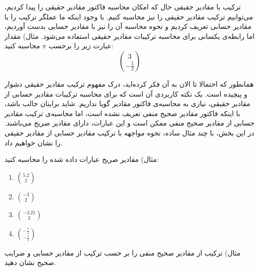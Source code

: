 \begin{EXTRA}{
    ترکیب با مقادیر حقیقی
}
\p
حال که امکان محاسبه فاکتور مقادیر حقیقی را پیدا کردیم، می‌توانیم ترکیب مقادیر
حقیقی را نیز محاسبه کنیم. با وجود اینکه ما عملگر ترکیب
را با مقادیر حسابی تعریف کردیم و نحوه محاسبه آن را نیز با مقادیر حسابی بدست آوردیم،
اما رابطه‌ی یکسانی برای محاسبه ترکیبات مقادیر حقیقی استفاده می‌شود.
\p
مثال)
مقدار عبارت زیر را برحسب $\pi$ محاسبه کنید:
$$3 \choose -\frac{5}{2}$$

\p
همانطور که احتمالا تا الان به آن فکر کرده‌اید، درک مفهوم ترکیب مقادیر حقیقی دشوار و پیچیده است.
\p
یک نکته کاربردی آن است که برای محاسبه ترکیبات مقادیر حسابی از مقادیر حقیقی، نیازی به
محاسبه‌ی فاکتور مقادیر گویا نداریم.
شاید برایتان جالب باشد، با اینکه فاکتور مقادیر صحیح منفی تعریف نشده است، اما محاسبه‌ی
ترکیب مقادیر حسابی از مقادیر صحیح منفی ممکن است و این عبارات، دارای مقادیر صریح می‌باشند.
در این بخش، با چند مثال ساده، نحوه مواجهه با ترکیب مقادیر حسابی از مقادیر حقیقی را نشان خواهیم داد.

\p
مثال)
مقادیر صریح عبارات داده شده را محاسبه کنید:

    \begin{enumerate}
        \item 
        $5.2 \choose 2$


        \item 
        $-3 \choose 2$


        \item 
        $-3.21 \choose 2$


        \item 
        $-\frac{7}{2} \choose -\frac{1}{2}$

    \end{enumerate}

\p
مثال)
ترکیب از مقادیر صحیح منفی را بر حسب ترکیب از مقادیر حسابی و ضرایب صحیح نشان دهید.
    

\end{EXTRA}
